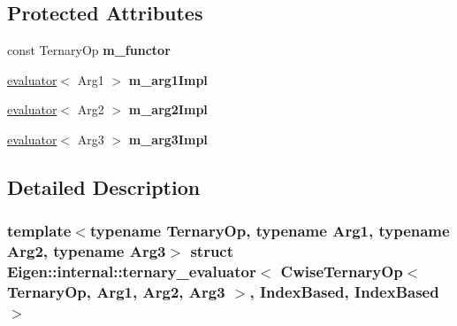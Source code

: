 \subsection*{Protected Attributes}
\begin{DoxyCompactItemize}
\item 
\mbox{\label{struct_eigen_1_1internal_1_1ternary__evaluator_3_01_cwise_ternary_op_3_01_ternary_op_00_01_arg1_daf42d21bcfee99cfa54e03ffa9506fc_aba9185a8f6ae515aac3192f1ea535524}} 
const Ternary\+Op {\bfseries m\+\_\+functor}
\item 
\mbox{\label{struct_eigen_1_1internal_1_1ternary__evaluator_3_01_cwise_ternary_op_3_01_ternary_op_00_01_arg1_daf42d21bcfee99cfa54e03ffa9506fc_af3ccc8e3f7582f5257d131450b7d8b0b}} 
\hyperlink{struct_eigen_1_1internal_1_1evaluator}{evaluator}$<$ Arg1 $>$ {\bfseries m\+\_\+arg1\+Impl}
\item 
\mbox{\label{struct_eigen_1_1internal_1_1ternary__evaluator_3_01_cwise_ternary_op_3_01_ternary_op_00_01_arg1_daf42d21bcfee99cfa54e03ffa9506fc_af54b21ef0ef9d5f5451e110724fcb398}} 
\hyperlink{struct_eigen_1_1internal_1_1evaluator}{evaluator}$<$ Arg2 $>$ {\bfseries m\+\_\+arg2\+Impl}
\item 
\mbox{\label{struct_eigen_1_1internal_1_1ternary__evaluator_3_01_cwise_ternary_op_3_01_ternary_op_00_01_arg1_daf42d21bcfee99cfa54e03ffa9506fc_a19578994967538b50444c2424919c63d}} 
\hyperlink{struct_eigen_1_1internal_1_1evaluator}{evaluator}$<$ Arg3 $>$ {\bfseries m\+\_\+arg3\+Impl}
\end{DoxyCompactItemize}


\subsection{Detailed Description}
\subsubsection*{template$<$typename Ternary\+Op, typename Arg1, typename Arg2, typename Arg3$>$\newline
struct Eigen\+::internal\+::ternary\+\_\+evaluator$<$ Cwise\+Ternary\+Op$<$ Ternary\+Op, Arg1, Arg2, Arg3 $>$, Index\+Based, Index\+Based $>$}



